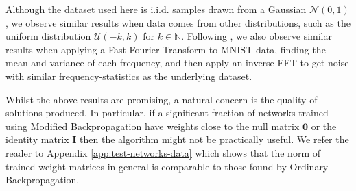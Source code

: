 \documentclass{article}
\theoremstyle{plain}
\theoremstyle{definition}
\theoremstyle{remark}
\newcommand{\vI}{\mathbf{I}}
\begin{document}
Although the dataset used here is i.i.d. samples drawn from a Gaussian ${\mathcal{N}(0, 1)}$, we observe similar results when data comes from other distributions, such as the uniform distribution ${\mathcal{U}(-k, k)}$ for ${k \in \mathbb{N}}$. Following \citealt{shocher-ign}, we also observe similar results when applying a Fast Fourier Transform to MNIST data, finding the mean and variance of each frequency, and then apply an inverse FFT to get noise with similar frequency-statistics as the underlying dataset.

Whilst the above results are promising, a natural concern is the quality of solutions produced. In particular, if a significant fraction of networks trained using Modified Backpropagation have weights close to the null matrix $\bm{0}$ or the identity matrix $\vI$ then the algorithm might not be practically useful. We refer the reader to Appendix \ref{app:test-networks-data} which shows that the norm of trained weight matrices in general is comparable to those found by Ordinary Backpropagation.

\begin{figure}[!b]
    \centering
\end{figure}
\end{document}
